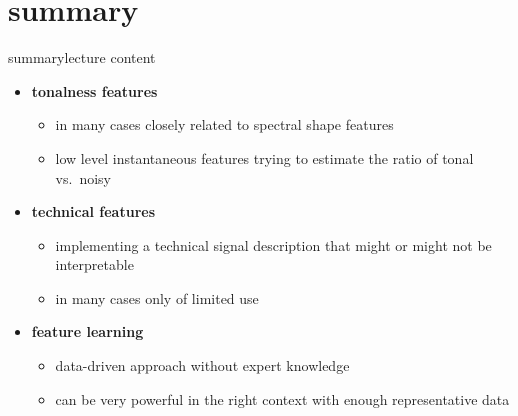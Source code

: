         
    \section{summary}
        \begin{frame}{summary}{lecture content}
            \begin{itemize}
                \item   \textbf{tonalness features}
                    \begin{itemize}
                        \item   in many cases closely related to spectral shape features
                        \item   low level instantaneous features trying to estimate the ratio of tonal vs.\ noisy
                    \end{itemize}
                \bigskip
                \item   \textbf{technical features}
                    \begin{itemize}
                        \item   implementing a technical signal description that might or might not be interpretable
                        \item   in many cases only of limited use
                    \end{itemize}
                \bigskip
                \item   \textbf{feature learning}
                    \begin{itemize}
                        \item   data-driven approach without expert knowledge
                        \item   can be very powerful in the right context with enough representative data
                    \end{itemize}
            \end{itemize}
        \end{frame}

